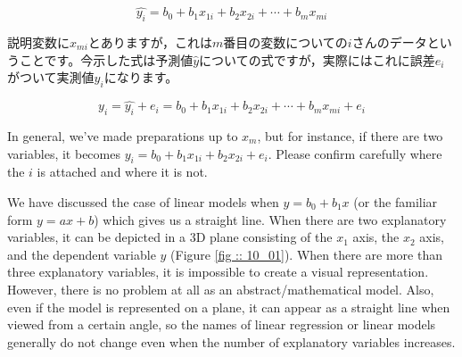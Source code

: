\documentclass{ltjbook}
\begin{document}
\[\hat{y_i}=b_0 + b_1x_{1i}+b_2x_{2i}+\cdots+b_mx_{mi}\]

説明変数に$x_{mi}$とありますが，これは$m$番目の変数についての$i$さんのデータということです。今示した式は予測値$\hat{y}$についての式ですが，実際にはこれに誤差$e_i$がついて実測値$y_i$になります。

\[ y_i = \hat{y_i} + e_i = b_0 + b_1x_{1i}+b_2x_{2i}+\cdots+b_mx_{mi} + e_i \]

In general, we've made preparations up to $x_m$, but for instance, if there are two variables, it becomes $y_i = b_0 + b_1x_{1i} + b_2x_{2i} + e_i$. Please confirm carefully where the $i$ is attached and where it is not.

We have discussed the case of linear models when $y = b_0 + b_1 x$ (or the familiar form $y = ax + b$) which gives us a straight line. When there are two explanatory variables, it can be depicted in a 3D plane consisting of the $x_1$ axis, the $x_2$ axis, and the dependent variable $y$ (Figure \ref {fig :: 10_01}). When there are more than three explanatory variables, it is impossible to create a visual representation. However, there is no problem at all as an abstract/mathematical model. Also, even if the model is represented on a plane, it can appear as a straight line when viewed from a certain angle, so the names of linear regression or linear models generally do not change even when the number of explanatory variables increases.


\end{document}
